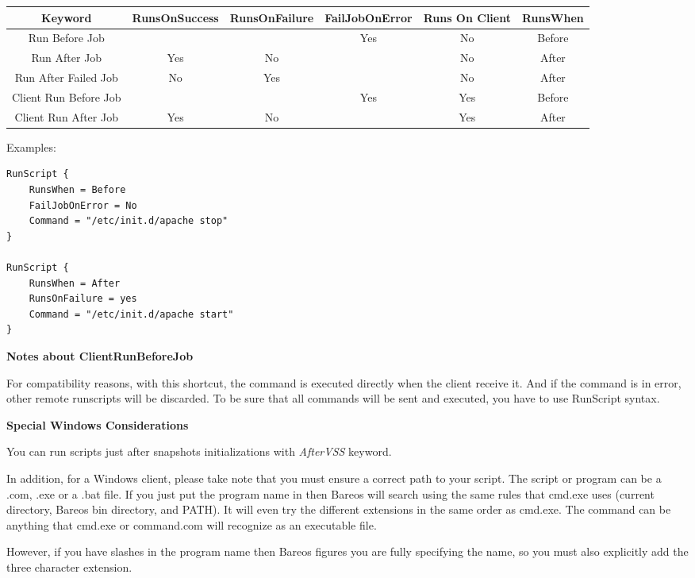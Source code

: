 \begin{description}
\begin{tabular}{|c|c|c|c|c|c}
\hline
Keyword & RunsOnSuccess & RunsOnFailure  & FailJobOnError & Runs On Client & RunsWhen  \\
\hline
\hline
Run Before Job         &        &       & Yes     & No     & Before \\
\hline
Run After Job          &  Yes   &   No  &         & No     & After  \\
\hline
Run After Failed Job   &  No    &  Yes  &         & No     & After  \\
\hline
Client Run Before Job  &        &       & Yes     & Yes    & Before \\
\hline
Client Run After Job   &  Yes   &   No  &         & Yes    & After  \\
\hline
\end{tabular}

Examples:
\begin{verbatim}
RunScript {
    RunsWhen = Before
    FailJobOnError = No
    Command = "/etc/init.d/apache stop"
}

RunScript {
    RunsWhen = After
    RunsOnFailure = yes
    Command = "/etc/init.d/apache start"
}
\end{verbatim}

{\bf Notes about ClientRunBeforeJob}

For compatibility reasons, with this shortcut, the command is executed
directly when the client receive it. And if the command is in error, other
remote runscripts will be discarded. To be sure that all commands will be
sent and executed, you have to use RunScript syntax.

{\bf Special Windows Considerations}

You can run scripts just after snapshots initializations with
\textsl{AfterVSS} keyword.

In addition, for a Windows client, please take
note that you must ensure a correct path to your script.  The script or
program can be a .com, .exe or a .bat file.  If you just put the program
name in then Bareos will search using the same rules that cmd.exe uses
(current directory, Bareos bin directory, and PATH).  It will even try the
different extensions in the same order as cmd.exe.
The command can be anything that cmd.exe or command.com will recognize
as an executable file.

However, if you have slashes in the program name then Bareos figures you
are fully specifying the name, so you must also explicitly add the three
character extension.


\end{description}
